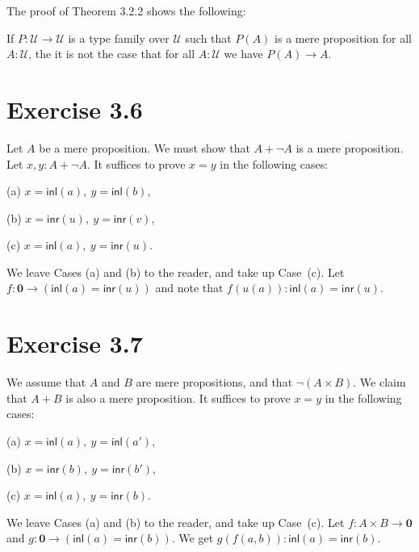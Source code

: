 \documentclass[12pt]{article}
\newcommand{\mbf}{\mathbf}
\newcommand{\msf}{\mathsf}
\newcommand{\nn}{\noindent}
\newcommand{\U}{\mathcal U}
\begin{document}
The proof of Theorem 3.2.2 shows the following:

If $P:\U\to\U$ is a type family over $\U$ such that $P(A)$ is a mere proposition for all $A:\U$, the it is not the case that for all $A:\U$ we have $P(A)\to A$.




\section{Exercise 3.6}

Let $A$ be a mere proposition. We must show that $A+\neg A$ is a mere proposition. Let $x,y:A+\neg A$. It suffices to prove $x=y$ in the following cases:

(a) $x=\msf{inl}(a),\ y=\msf{inl}(b)$,

(b) $x=\msf{inr}(u),\ y=\msf{inr}(v)$,

(c) $x=\msf{inl}(a),\ y=\msf{inr}(u)$.

\nn We leave Cases (a) and (b) to the reader, and take up Case~(c). Let $f:\mbf0\to(\msf{inl}(a)=\msf{inr}(u))$ and note that $f(u(a)):\msf{inl}(a)=\msf{inr}(u)$.


\section{Exercise 3.7}

We assume that $A$ and $B$ are mere propositions, and that $\neg(A\times B)$. We claim that $A+B$ is also a mere proposition. It suffices to prove $x=y$ in the following cases:

(a) $x=\msf{inl}(a),\ y=\msf{inl}(a')$,

(b) $x=\msf{inr}(b),\ y=\msf{inr}(b')$,

(c) $x=\msf{inl}(a),\ y=\msf{inr}(b)$.

\nn We leave Cases (a) and (b) to the reader, and take up Case~(c). Let $f:A\times B\to\mbf0$ and $g:\mbf0\to(\msf{inl}(a)=\msf{inr}(b))$. We get $g(f(a,b)):\msf{inl}(a)=\msf{inr}(b)$.

\end{document}

